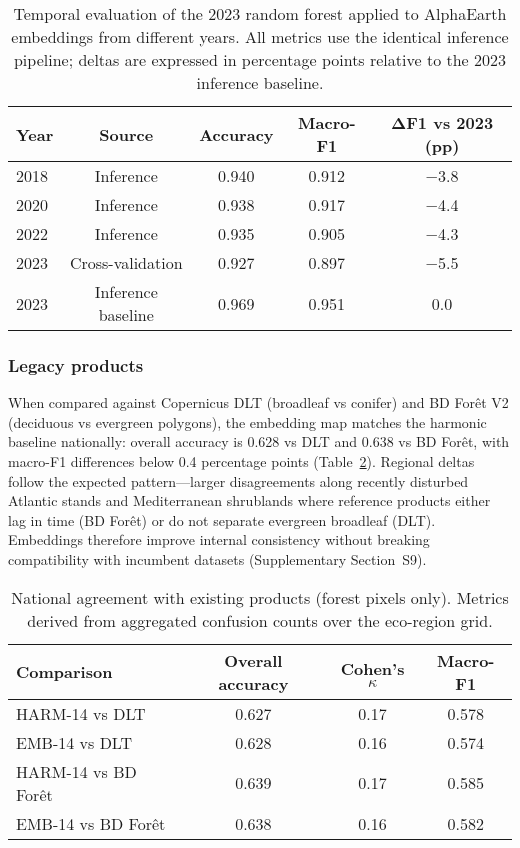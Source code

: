 \documentclass[utf8]{FrontiersinHarvard}
\begin{document}
\begin{table}[H]
    \centering
    \small
    \begin{tabular}{lcccc}
        \toprule
        \textbf{Year} & \textbf{Source} & \textbf{Accuracy} & \textbf{Macro-F1} & \textbf{ΔF1 vs 2023 (pp)} \\
        \midrule
        2018 & Inference & 0.940 & 0.912 & −3.8 \\
        2020 & Inference & 0.938 & 0.917 & −4.4 \\
        2022 & Inference & 0.935 & 0.905 & −4.3 \\
        2023 & Cross-validation & 0.927 & 0.897 & −5.5 \\
        2023 & Inference baseline & 0.969 & 0.951 & 0.0 \\
        \bottomrule
    \end{tabular}
    \caption{Temporal evaluation of the 2023 random forest applied to AlphaEarth embeddings from different years. All metrics use the identical inference pipeline; deltas are expressed in percentage points relative to the 2023 inference baseline.}
    \label{tab:temporal_stability}
\end{table}

\subsubsection{Legacy products}

When compared against Copernicus DLT (broadleaf vs conifer) and BD Forêt V2 (deciduous vs evergreen polygons), the embedding map matches the harmonic baseline nationally: overall accuracy is 0.628 vs DLT and 0.638 vs BD Forêt, with macro-F1 differences below 0.4 percentage points (Table~\ref{tab:product_comparison_national}). Regional deltas follow the expected pattern—larger disagreements along recently disturbed Atlantic stands and Mediterranean shrublands where reference products either lag in time (BD Forêt) or do not separate evergreen broadleaf (DLT). Embeddings therefore improve internal consistency without breaking compatibility with incumbent datasets (Supplementary Section~S9).

\begin{table}[H]
    \centering
    \small
    \caption{National agreement with existing products (forest pixels only). Metrics derived from aggregated confusion counts over the eco-region grid.}
    \begin{tabular}{lccc}
        \toprule
        \textbf{Comparison} & \textbf{Overall accuracy} & \textbf{Cohen's $\kappa$} & \textbf{Macro-F1} \\
        \midrule
        HARM-14 vs DLT & 0.627 & 0.17 & 0.578 \\
        EMB-14 vs DLT & 0.628 & 0.16 & 0.574 \\
        HARM-14 vs BD Forêt & 0.639 & 0.17 & 0.585 \\
        EMB-14 vs BD Forêt & 0.638 & 0.16 & 0.582 \\
        \bottomrule
    \end{tabular}
    \label{tab:product_comparison_national}
\end{table}
\end{document}
